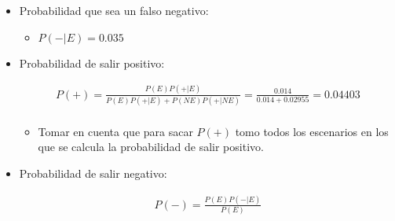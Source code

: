 \begin{itemize}
    \item Probabilidad que sea un falso negativo:
        \begin{itemize}
            \item $P(-|E) = 0.035$
        \end{itemize}
    
    \item Probabilidad de salir positivo:
        \begin{center}
           \begin{align*}
               P(+)= \frac{P(E)P(+|E)}{P(E)P(+|E) + P(NE)P(+|NE)} = \frac{0.014}{0.014+0.02955} = 0.04403 \\  
           \end{align*}
           \begin{itemize}[label=\#]
               \item Tomar en cuenta que para sacar $P(+)$ tomo todos los escenarios en los que se calcula la probabilidad de salir positivo.
           \end{itemize}
        \end{center}
    
    \item Probabilidad de salir negativo:
        \begin{center}
           \begin{align*}
               P(-) =\frac{P(E)P(-|E)}{P(E)} 
           \end{align*}
        \end{center}
\end{itemize}


